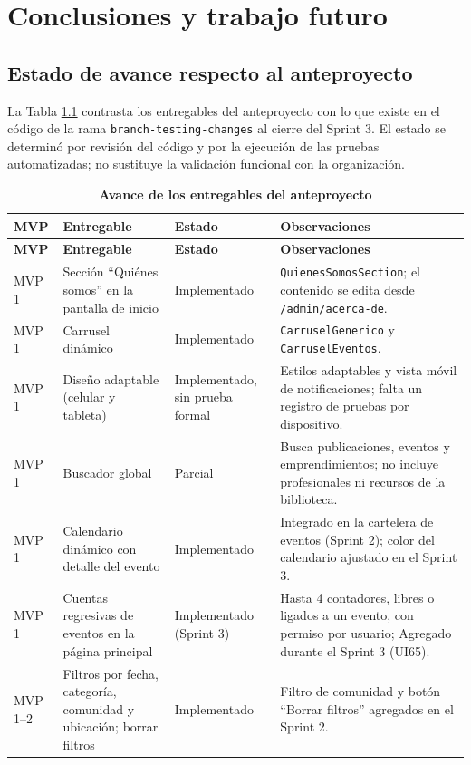 \chapter{Conclusiones y trabajo futuro}
\section{Estado de avance respecto al anteproyecto}
La Tabla \ref{tab:avance} contrasta los entregables del anteproyecto con lo que existe en el código de la rama \texttt{branch-testing-changes} al cierre del Sprint 3. El estado se determinó por revisión del código y por la ejecución de las pruebas automatizadas; no sustituye la validación funcional con la organización.

\begin{longtable}{|p{2cm}|p{5.5cm}|p{2.6cm}|p{4.7cm}|}
\caption{\textbf{Avance de los entregables del anteproyecto}}\label{tab:avance}\\
\hline
\textbf{MVP} & \textbf{Entregable} & \textbf{Estado} & \textbf{Observaciones} \\
\hline
\endfirsthead
\hline
\textbf{MVP} & \textbf{Entregable} & \textbf{Estado} & \textbf{Observaciones} \\
\hline
\endhead
MVP 1 & Sección ``Quiénes somos'' en la pantalla de inicio & Implementado & \texttt{QuienesSomosSection}; el contenido se edita desde \texttt{/admin/acerca-de}. \\
\hline
MVP 1 & Carrusel dinámico & Implementado & \texttt{CarruselGenerico} y \texttt{CarruselEventos}. \\
\hline
MVP 1 & Diseño adaptable (celular y tableta) & Implementado, sin prueba formal & Estilos adaptables y vista móvil de notificaciones; falta un registro de pruebas por dispositivo. \\
\hline
MVP 1 & Buscador global & Parcial & Busca publicaciones, eventos y emprendimientos; no incluye profesionales ni recursos de la biblioteca. \\
\hline
MVP 1 & Calendario dinámico con detalle del evento & Implementado & Integrado en la cartelera de eventos (Sprint 2); color del calendario ajustado en el Sprint 3. \\
\hline
MVP 1 & Cuentas regresivas de eventos en la página principal & Implementado (Sprint 3) & Hasta 4 contadores, libres o ligados a un evento, con permiso por usuario; Agregado durante el Sprint 3 (UI65). \\
\hline
MVP 1--2 & Filtros por fecha, categoría, comunidad y ubicación; borrar filtros & Implementado & Filtro de comunidad y botón ``Borrar filtros'' agregados en el Sprint 2. \\

\end{longtable}
